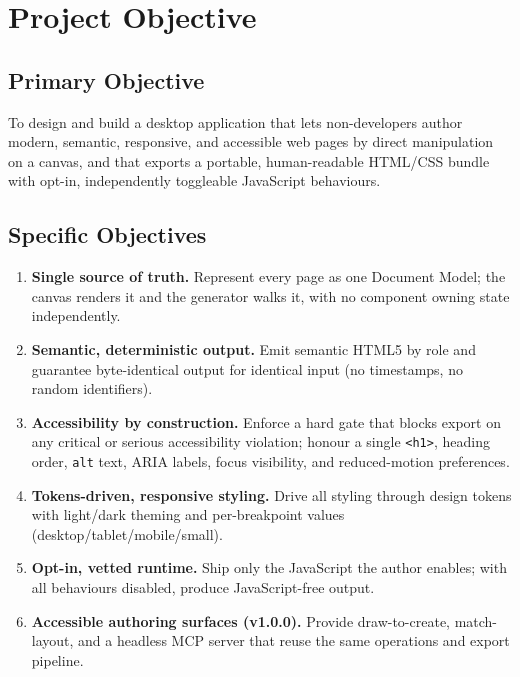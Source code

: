 
\chapter{Project Objective}
\label{ch:objective}

\section{Primary Objective}
To design and build a desktop application that lets non-developers author modern,
semantic, responsive, and accessible web pages by direct manipulation on a canvas,
and that exports a portable, human-readable HTML/CSS bundle with opt-in,
independently toggleable JavaScript behaviours.

\section{Specific Objectives}
\begin{enumerate}[label=\textbf{O\arabic*.}, leftmargin=3.2em]
  \item \textbf{Single source of truth.} Represent every page as one Document
        Model; the canvas renders it and the generator walks it, with no
        component owning state independently.
  \item \textbf{Semantic, deterministic output.} Emit semantic HTML5 by role and
        guarantee byte-identical output for identical input (no timestamps, no
        random identifiers).
  \item \textbf{Accessibility by construction.} Enforce a hard gate that blocks
        export on any critical or serious accessibility violation; honour a single
        \texttt{<h1>}, heading order, \texttt{alt} text, ARIA labels, focus
        visibility, and reduced-motion preferences.
  \item \textbf{Tokens-driven, responsive styling.} Drive all styling through
        design tokens with light/dark theming and per-breakpoint values
        (desktop/tablet/mobile/small).
  \item \textbf{Opt-in, vetted runtime.} Ship only the JavaScript the author
        enables; with all behaviours disabled, produce JavaScript-free output.
  \item \textbf{Accessible authoring surfaces (v1.0.0).} Provide draw-to-create,
        match-layout, and a headless MCP server that reuse the same operations and
        export pipeline.
\end{enumerate}

